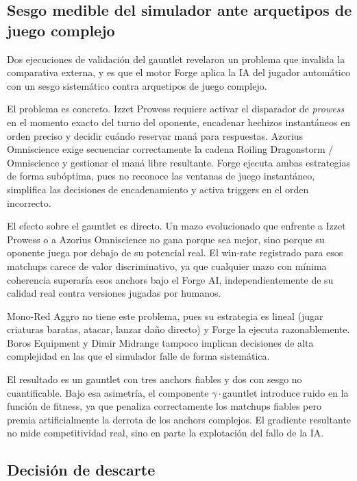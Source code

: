 \subsection{Sesgo medible del simulador ante arquetipos de juego complejo}

Dos ejecuciones de validación del gauntlet revelaron un problema que invalida la comparativa externa, y es que el motor Forge aplica la IA del jugador automático con un sesgo sistemático contra arquetipos de juego complejo.

El problema es concreto. Izzet Prowess requiere activar el disparador de \emph{prowess} en el momento exacto del turno del oponente, encadenar hechizos instantáneos en orden preciso y decidir cuándo reservar maná para respuestas. Azorius Omniscience exige secuenciar correctamente la cadena Roiling Dragonstorm / Omniscience y gestionar el maná libre resultante. Forge ejecuta ambas estrategias de forma subóptima, pues no reconoce las ventanas de juego instantáneo, simplifica las decisiones de encadenamiento y activa triggers en el orden incorrecto.

El efecto sobre el gauntlet es directo. Un mazo evolucionado que enfrente a Izzet Prowess o a Azorius Omniscience no gana porque sea mejor, sino porque su oponente juega por debajo de su potencial real. El win-rate registrado para esos matchups carece de valor discriminativo, ya que cualquier mazo con mínima coherencia superaría esos anchors bajo el Forge AI, independientemente de su calidad real contra versiones jugadas por humanos.

Mono-Red Aggro no tiene este problema, pues su estrategia es lineal (jugar criaturas baratas, atacar, lanzar daño directo) y Forge la ejecuta razonablemente. Boros Equipment y Dimir Midrange tampoco implican decisiones de alta complejidad en las que el simulador falle de forma sistemática.

El resultado es un gauntlet con tres anchors fiables y dos con sesgo no cuantificable. Bajo esa asimetría, el componente $\gamma \cdot \text{gauntlet}$ introduce ruido en la función de fitness, ya que penaliza correctamente los matchups fiables pero premia artificialmente la derrota de los anchors complejos. El gradiente resultante no mide competitividad real, sino en parte la explotación del fallo de la IA.

\subsection{Decisión de descarte}

